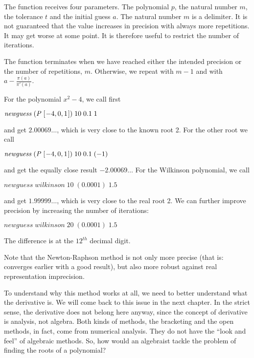 \documentclass[tikz]{scrreprt}
\newcommand{\Conid}[1]{\mathit{#1}}
\newcommand{\Varid}[1]{\mathit{#1}}
\begin{document}
The function receives four parameters.
The polynomial \ensuremath{\Varid{p}}, the natural number \ensuremath{\Varid{m}},
the tolerance \ensuremath{\Varid{t}} and the initial guess \ensuremath{\Varid{a}}.
The natural number \ensuremath{\Varid{m}} is a delimiter.
It is not guaranteed that the value increases
in precision with always more repetitions.
It may get worse at some point.
It is therefore useful to restrict the number
of iterations.

The function terminates when we have 
reached either the intended precision or 
the number of repetitions, $m$.
Otherwise, we repeat with $m-1$ and with
$a - \frac{\pi(a)}{\pi'(a)}$.

For the polynomial $x^2 - 4$, we call first

\ensuremath{\Varid{newguess}\;(\Conid{P}\;[\mskip1.5mu \mathbin{-}\mathrm{4},\mathrm{0},\mathrm{1}\mskip1.5mu])\;\mathrm{10}\;\mathrm{0.1}\;\mathrm{1}}

and get $2.00069\dots$, which is very close
to the known root 2.
For the other root we call

\ensuremath{\Varid{newguess}\;(\Conid{P}\;[\mskip1.5mu \mathbin{-}\mathrm{4},\mathrm{0},\mathrm{1}\mskip1.5mu])\;\mathrm{10}\;\mathrm{0.1}\;(\mathbin{-}\mathrm{1})}

and get the equally close result $-2.00069\dots$
For the Wilkinson polynomial, we call

\ensuremath{\Varid{newguess}\;\Varid{wilkinson}\;\mathrm{10}\;(\mathrm{0.0001})\;\mathrm{1.5}}

and get $1.99999\dots$, which is very close
to the real root 2. We can further improve
precision by increasing the number of iterations:

\ensuremath{\Varid{newguess}\;\Varid{wilkinson}\;\mathrm{20}\;(\mathrm{0.0001})\;\mathrm{1.5}}

The difference is at the $12^{th}$ decimal digit.

Note that the Newton-Raphson method
is not only more precise (that is: converges earlier
with a good result), but also more robust against
real representation imprecision.

To understand why this method works at all,
we need to better understand what the derivative is.
We will come back to this issue in the next chapter.
In the strict sense, the derivative does not belong
here anyway, since the concept of derivative is
analysis, not algebra. Both kinds of methods,
the bracketing and the open methods, in fact, come
from numerical analysis.
They do not have the ``look and feel'' of algebraic
methods. So, how would an algebraist tackle the
problem of finding the roots of a polynomial?
\end{document}
